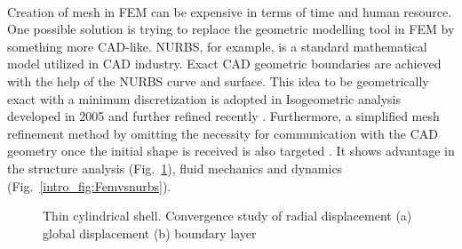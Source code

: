 \paragraph{}
Creation of mesh in FEM can be expensive in terms of time and human resource.
One possible solution is trying to replace the geometric modelling tool in FEM by something more CAD-like.
NURBS, for example, is a standard mathematical model utilized in CAD industry.
Exact CAD geometric boundaries are achieved with the help of the NURBS curve and surface.
This idea to be geometrically exact with a minimum discretization is adopted in Isogeometric analysis developed in 2005 \citep{Hug2005b} and further refined recently \citep{Zhang2007,Hug2005b,Cot2006,Cot2009,Baz2006a,Baz2006b}.
Furthermore, a simplified mesh refinement method by omitting the necessity for communication with the CAD geometry once the initial shape is received is also targeted \citep{Cot2007}.
It shows advantage in the structure analysis (Fig.~\ref{intro_fig:thinshell}), fluid mechanics \citep{Buf2011} and dynamics (Fig.~\ref{intro_fig:Femvsnurbs}).
%
\begin{figure}
    \centering
    \caption[Thin cylindrical shell]{Thin cylindrical shell. Convergence study of radial displacement (a) global displacement  (b) boundary layer \citep{Hug2005}}
    \label{intro_fig:thinshell}
\end{figure}
